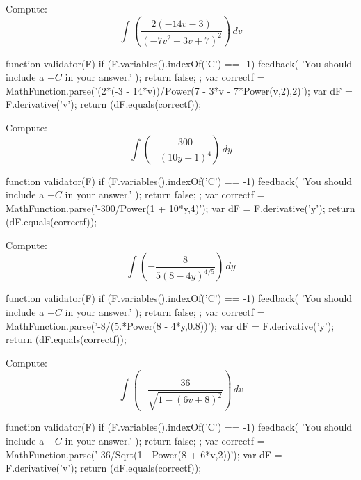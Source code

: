 \documentclass{ximera}
\renewcommand{\d}{\, d}
\begin{document}
\begin{exercise}
Compute: 
\[
\int \left(\frac{2 (-14 v-3)}{\left(-7 v^2-3 v+7\right)^2}\right)\d v
\]
\begin{expressionAnswer}
     function validator(F) {
      if (F.variables().indexOf('C') == -1) {
        feedback( 'You should include a $+C$ in your answer.' );
        return false;
      };      
      var correctf = MathFunction.parse('(2*(-3 - 14*v))/Power(7 - 3*v - 7*Power(v,2),2)');
      var dF = F.derivative('v');
      return (dF.equals(correctf));
    }
\end{expressionAnswer}
\end{exercise}



\begin{exercise}
Compute: 
\[
\int \left(-\frac{300}{(10 y+1)^4}\right)\d y
\]
\begin{expressionAnswer}
     function validator(F) {
      if (F.variables().indexOf('C') == -1) {
        feedback( 'You should include a $+C$ in your answer.' );
        return false;
      };      
      var correctf = MathFunction.parse('-300/Power(1 + 10*y,4)');
      var dF = F.derivative('y');
      return (dF.equals(correctf));
    }
\end{expressionAnswer}
\end{exercise}



\begin{exercise}
Compute: 
\[
\int \left(-\frac{8}{5 (8-4 y)^{4/5}}\right)\d y
\]
\begin{expressionAnswer}
     function validator(F) {
      if (F.variables().indexOf('C') == -1) {
        feedback( 'You should include a $+C$ in your answer.' );
        return false;
      };      
      var correctf = MathFunction.parse('-8/(5.*Power(8 - 4*y,0.8))');
      var dF = F.derivative('y');
      return (dF.equals(correctf));
    }
\end{expressionAnswer}
\end{exercise}



\begin{exercise}
Compute: 
\[
\int \left(-\frac{36}{\sqrt{1-(6 v+8)^2}}\right)\d v
\]
\begin{expressionAnswer}
     function validator(F) {
      if (F.variables().indexOf('C') == -1) {
        feedback( 'You should include a $+C$ in your answer.' );
        return false;
      };      
      var correctf = MathFunction.parse('-36/Sqrt(1 - Power(8 + 6*v,2))');
      var dF = F.derivative('v');
      return (dF.equals(correctf));
    }
\end{expressionAnswer}
\end{exercise}
\end{document}
